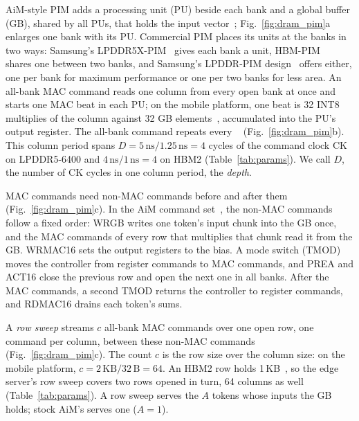 AiM-style PIM adds a processing unit (PU) beside each bank and a global buffer (GB),
shared by all PUs, that holds the input vector~\cite{aimjssc,hbmpim}; Fig.~\ref{fig:dram_pim}a enlarges one bank with
its PU. Commercial PIM places its units at the banks in two ways: Samsung's LPDDR5X-PIM~\cite{lp5xpim} gives each bank a
unit, HBM-PIM~\cite{hbmpim} shares one between two banks, and Samsung's LPDDR-PIM design~\cite{hc35pim} offers either,
one per bank for maximum performance or one per two banks for less area. An all-bank MAC command reads one column from every open bank at once and starts one MAC
beat in each PU; on the mobile platform, one beat is 32 INT8 multiplies of the column against 32 GB elements~\cite{lpspec},
accumulated into the PU's output register. The all-bank command repeats every \tccdl~\cite{hbmpim}
(Fig.~\ref{fig:dram_pim}b). This column period \tcol spans $D = 5\,\text{ns} / 1.25\,\text{ns} = 4$ cycles \tck of
the command clock CK on LPDDR5-6400 and $4\,\text{ns} / 1\,\text{ns} = 4$ on HBM2 (Table~\ref{tab:params}). We call
$D$, the number of CK cycles in one column period, the \emph{depth}.

MAC commands need non-MAC commands before and after them (Fig.~\ref{fig:dram_pim}c). In the AiM command set~\cite{aimjssc}, the non-MAC commands follow a fixed order: WRGB writes one token's input chunk into the GB once, and the MAC commands of every row that multiplies that chunk
read it from the GB. WRMAC16 sets the output registers to the bias. A mode switch (TMOD) moves the controller from
register commands to MAC commands, and PREA and ACT16 close the previous row and open the next one in all banks. After
the MAC commands, a second TMOD returns the controller to register commands, and RDMAC16 drains each token's sums.

A \emph{row sweep} streams $c$ all-bank MAC commands over one open row, one command per column, between these non-MAC
commands (Fig.~\ref{fig:dram_pim}c). The count $c$ is the row size over the column size: on the mobile platform,
$c = 2\,\text{KB} / 32\,\text{B} = 64$. An HBM2 row holds 1\,KB~\cite{jedechbm2}, so the edge server's row sweep covers
two rows opened in turn, 64 columns as well (Table~\ref{tab:params}). A row sweep serves the $A$ tokens whose inputs the GB
holds; stock AiM's serves one ($A = 1$).
